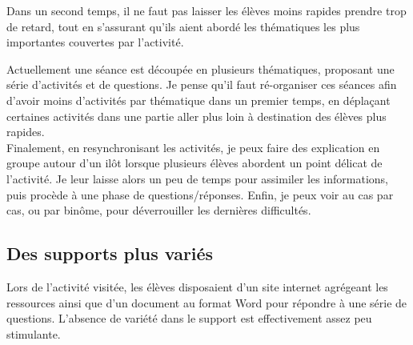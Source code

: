 \documentclass[pdftex,a4paper,12pt]{article}
\begin{document}
	Dans un second temps, il ne faut pas laisser les élèves moins rapides prendre trop de retard, 
	tout en s'assurant qu'ils aient abordé les thématiques les plus importantes couvertes par l'activité.

	Actuellement une séance est découpée en plusieurs thématiques, proposant une série d'activités et de questions.
	Je pense qu'il faut ré-organiser ces séances afin d'avoir moins d'activités par thématique dans un premier temps, 
	en déplaçant certaines activités dans une partie \og{}aller plus loin\fg{} à destination des élèves plus rapides.\\

	Finalement, en resynchronisant les activités, je peux faire des explication en groupe autour d'un ilôt 
	lorsque plusieurs élèves abordent un point délicat de l'activité.
	Je leur laisse alors un peu de temps pour assimiler les informations, puis procède à une phase de questions/réponses.
	Enfin, je peux voir au cas par cas, ou par binôme, pour déverrouiller les dernières difficultés.

	\subsection{Des supports plus variés}
	Lors de l'activité visitée, les élèves disposaient d'un site internet agrégeant les ressources ainsi que 
	d'un document au format Word pour répondre à une série de questions. 
	L'absence de variété dans le support est effectivement assez peu stimulante.
\end{document}
